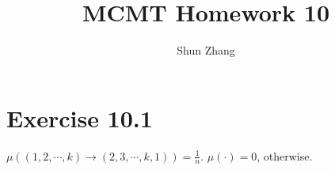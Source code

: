 \documentclass[10pt]{article}
\title{MCMT Homework 10}
\author{Shun Zhang}
\date{}
\begin{document}
\maketitle

\section*{Exercise 10.1}

$\mu((1, 2, \cdots, k) \rightarrow (2, 3, \cdots, k, 1)) = \frac{1}{n}$.
$\mu(\cdot) = 0$, otherwise.
\end{document}

